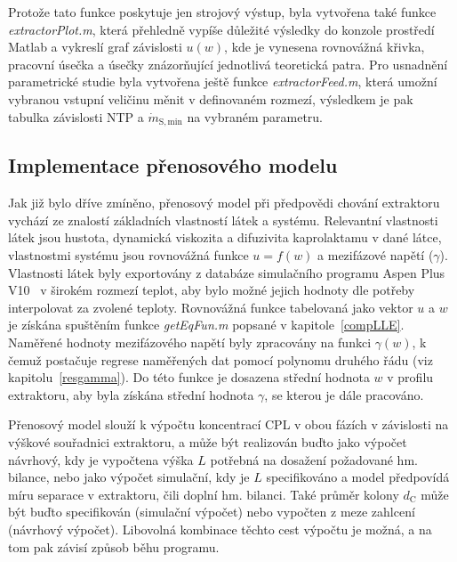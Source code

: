 Protože tato funkce poskytuje jen strojový výstup, byla vytvořena také funkce \textit{extractorPlot.m}, která přehledně vypíše důležité výsledky do konzole prostředí Matlab a vykreslí graf závislosti $u(w)$, kde je vynesena rovnovážná křivka, pracovní úsečka a úsečky znázorňující jednotlivá teoretická patra.
Pro usnadnění parametrické studie byla vytvořena ještě funkce \textit{extractorFeed.m}, která umožní vybranou vstupní veličinu měnit v definovaném rozmezí, výsledkem je pak tabulka závislosti NTP a $\dot{m}_\mathrm{S,min}$ na vybraném parametru.

\subsection{Implementace přenosového modelu} \label{compTransfer}
Jak již bylo dříve zmíněno, přenosový model při předpovědi chování extraktoru vychází ze znalostí základních vlastností látek a systému.
Relevantní vlastnosti látek jsou hustota, dynamická viskozita a difuzivita kaprolaktamu v dané látce, vlastnostmi systému jsou rovnovážná funkce $u = f(w)$ a mezifázové napětí ($\gamma$).
Vlastnosti látek byly exportovány z databáze simulačního programu Aspen Plus V10~\cite{Aspen} v širokém rozmezí teplot, aby bylo možné jejich hodnoty dle potřeby interpolovat za zvolené teploty.
Rovnovážná funkce tabelovaná jako vektor $u$ a $w$ je získána spuštěním funkce \textit{getEqFun.m} popsané v kapitole~\ref{compLLE}.
Naměřené hodnoty mezifázového napětí byly zpracovány na funkci $\gamma(w)$, k čemuž postačuje regrese naměřených dat pomocí polynomu druhého řádu (viz kapitolu~\ref{resgamma}).
Do této funkce je dosazena střední hodnota $w$ v profilu extraktoru, aby byla získána střední hodnota $\gamma$, se kterou je dále pracováno.

Přenosový model slouží k výpočtu koncentrací CPL v obou fázích v závislosti na výškové souřadnici extraktoru, a může být realizován buďto jako výpočet návrhový, kdy je vypočtena výška $L$ potřebná na dosažení požadované hm. bilance, nebo jako výpočet simulační, kdy je $L$ specifikováno a model předpovídá míru separace v extraktoru, čili doplní hm. bilanci.
Také průměr kolony $d_\mathrm{C}$ může být buďto specifikován (simulační výpočet) nebo vypočten z meze zahlcení (návrhový výpočet).
Libovolná kombinace těchto cest výpočtu je možná, a na tom pak závisí způsob běhu programu.

